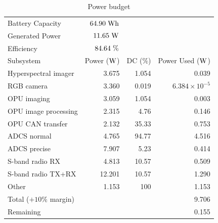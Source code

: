 \begin{table}[htbp]
	\caption{Power budget}
	\label{tab:power-budget}
	\centering
			\begin{tabular}{l r r r}
				\hline
				Battery Capacity & $64.90 \hspace{3pt} \rm{Wh}$ & & \\ 
				Generated Power & $11.65 \hspace{3pt} \rm{W}$ & & \\ 
			   Efficiency & $84.64 \hspace{3pt} \rm{\%}$ & & \\
			   \hline
			  Subsystem & Power ($\rm{W}$) & DC ($\%$) & Power Used ($\rm{W}$) \\
			  \hline
				Hyperspectral imager & 3.675 & 1.054 & 0.039 \\
				RGB camera & 3.360 & 0.019 & $6.384\times10^{-5}$ \\
				OPU imaging & 3.059 & 1.054 & 0.003 \\
			    OPU image processing & 2.315 & 4.76 & 0.146 \\
			    OPU CAN transfer & 2.132 & 35.33 & 0.753 \\
				ADCS normal & 4.765 & 94.77 & 4.516 \\
				ADCS precise & 7.907 & 5.23 & 0.414 \\
			    S-band radio RX & 4.813 & 10.57 & 0.509 \\
				S-band radio TX+RX & 12.201 & 10.57 & 1.290 \\
				Other & 1.153 & 100 & 1.153 \\
				\hline
				Total ($+10\%$ margin) &  & & 9.706 \\
				Remaining &  & & 0.155 \\
				\hline
				\end{tabular}
\end{table}


